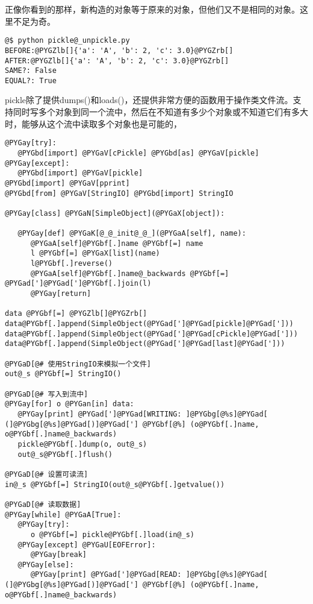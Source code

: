 \documentclass[letterpaper,10pt,english]{manual}
\begin{document}
正像你看到的那样，新构造的对象等于原来的对象，但他们又不是相同的对象。这里不足为奇。

\begin{Verbatim}[commandchars=@\[\]]
@$ python pickle@_unpickle.py
BEFORE:@PYGZlb[]{'a': 'A', 'b': 2, 'c': 3.0}@PYGZrb[]
AFTER:@PYGZlb[]{'a': 'A', 'b': 2, 'c': 3.0}@PYGZrb[]
SAME?: False
EQUAL?: True
\end{Verbatim}

pickle除了提供dumps()和loads()，还提供非常方便的函数用于操作类文件流。支持同时写多个对象到同一个流中，然后在不知道有多少个对象或不知道它们有多大时，能够从这个流中读取多个对象也是可能的，

\begin{Verbatim}[commandchars=@\[\]]
@PYGay[try]:
   @PYGbd[import] @PYGaV[cPickle] @PYGbd[as] @PYGaV[pickle]
@PYGay[except]:
   @PYGbd[import] @PYGaV[pickle]
@PYGbd[import] @PYGaV[pprint]
@PYGbd[from] @PYGaV[StringIO] @PYGbd[import] StringIO

@PYGay[class] @PYGaN[SimpleObject](@PYGaX[object]):

   @PYGay[def] @PYGaK[@_@_init@_@_](@PYGaA[self], name):
      @PYGaA[self]@PYGbf[.]name @PYGbf[=] name
      l @PYGbf[=] @PYGaX[list](name)
      l@PYGbf[.]reverse()
      @PYGaA[self]@PYGbf[.]name@_backwards @PYGbf[=] @PYGad[']@PYGad[']@PYGbf[.]join(l)
      @PYGay[return]

data @PYGbf[=] @PYGZlb[]@PYGZrb[]
data@PYGbf[.]append(SimpleObject(@PYGad[']@PYGad[pickle]@PYGad[']))
data@PYGbf[.]append(SimpleObject(@PYGad[']@PYGad[cPickle]@PYGad[']))
data@PYGbf[.]append(SimpleObject(@PYGad[']@PYGad[last]@PYGad[']))

@PYGaD[@# 使用StringIO来模拟一个文件]
out@_s @PYGbf[=] StringIO()

@PYGaD[@# 写入到流中]
@PYGay[for] o @PYGan[in] data:
   @PYGay[print] @PYGad[']@PYGad[WRITING: ]@PYGbg[@%s]@PYGad[ (]@PYGbg[@%s]@PYGad[)]@PYGad['] @PYGbf[@%] (o@PYGbf[.]name, o@PYGbf[.]name@_backwards)
   pickle@PYGbf[.]dump(o, out@_s)
   out@_s@PYGbf[.]flush()

@PYGaD[@# 设置可读流]
in@_s @PYGbf[=] StringIO(out@_s@PYGbf[.]getvalue())

@PYGaD[@# 读取数据]
@PYGay[while] @PYGaA[True]:
   @PYGay[try]:
      o @PYGbf[=] pickle@PYGbf[.]load(in@_s)
   @PYGay[except] @PYGaU[EOFError]:
      @PYGay[break]
   @PYGay[else]:
      @PYGay[print] @PYGad[']@PYGad[READ: ]@PYGbg[@%s]@PYGad[ (]@PYGbg[@%s]@PYGad[)]@PYGad['] @PYGbf[@%] (o@PYGbf[.]name, o@PYGbf[.]name@_backwards)
\end{Verbatim}
\end{document}
